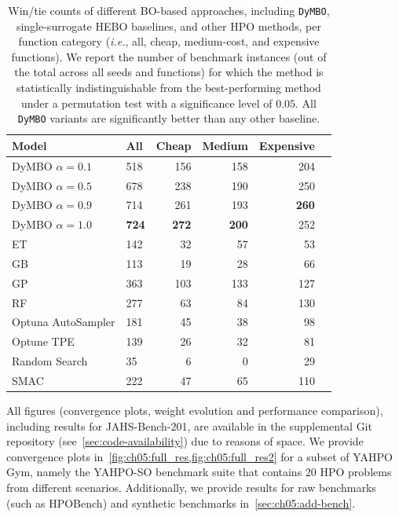 \begin{table}[ht]
    \centering
        \caption{
        Win/tie counts of different BO-based approaches, including \texttt{DyMBO}, single-surrogate HEBO baselines, and other HPO methods, per function category (\emph{i.e.}, all, cheap, medium-cost, and expensive functions).
        We report the number of benchmark instances (out of the total across all seeds and functions) for which the method is statistically indistinguishable from the best-performing method under a permutation test with a significance level of $0.05$. All \texttt{DyMBO} variants are significantly better than any other baseline.
        }

    \begin{tabular}{llrrrr}
\toprule
Model & All & Cheap & Medium & Expensive \\
\midrule
 DyMBO $\alpha=0.1$ & 518 & 156 & 158 & 204 \\
 DyMBO $\alpha=0.5$ & 678 & 238 & 190 & 250 \\
 DyMBO $\alpha=0.9$ & 714 & 261 & 193 & \textbf{260} \\
 DyMBO $\alpha=1.0$ & \textbf{724} & \textbf{272} & \textbf{200} & 252 \\
 ET & 142 & 32 & 57 & 53 \\
 GB & 113 & 19 & 28 & 66 \\
 GP & 363 & 103 & 133 & 127 \\
 RF & 277 & 63 & 84 & 130 \\
 Optuna AutoSampler & 181 & 45 & 38 & 98 \\
 Optune TPE & 139 & 26 & 32 & 81 \\
 Random Search & 35 & 6 & 0 & 29 \\
 SMAC & 222 & 47 & 65 & 110 \\
\bottomrule
\end{tabular}
    \label{tab:ch05:stat_signif}
\end{table}

All figures (convergence plots, weight evolution and performance comparison), including results for JAHS-Bench-201, are available in the supplemental Git repository (see~\cref{sec:code-availability})
due to reasons of space.
We provide convergence plots in~\cref{fig:ch05:full_res,fig:ch05:full_res2} for a subset of YAHPO Gym, namely the YAHPO-SO benchmark suite that contains 20 HPO problems from different scenarios. 
Additionally, we provide results for raw benchmarks (such as HPOBench) and synthetic benchmarks in~\cref{sec:ch05:add-bench}.


